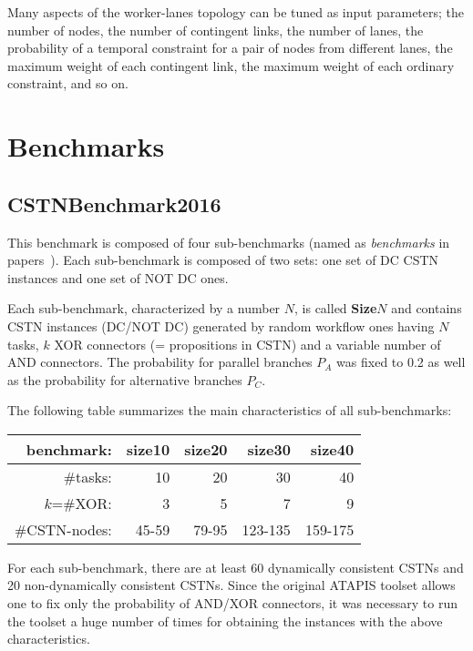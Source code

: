 \documentclass[a4paper,11pt]{article}
\begin{document}
Many aspects of the worker-lanes topology can be tuned as input parameters;  
the number of nodes, the number of contingent links, the number of lanes, the probability of a temporal constraint for a pair of nodes from different lanes, the maximum weight of each contingent link, the maximum weight of each ordinary constraint, and so on.



\section{Benchmarks}
\subsection{CSTNBenchmark2016}

This benchmark is composed of four sub-benchmarks (named as \textit{benchmarks} in papers~\cite{time2015,HunsbergerP16Icaps,CairoEtalTime2017,HunsbergerPFixed18,HunsbergerPEpsilon18,HunsbergerP20}).
Each sub-benchmark is composed of two sets: one set of DC CSTN instances and one set of NOT DC ones.

Each sub-benchmark, characterized by a number $N$, is called  \textbf{Size$N$} and contains CSTN instances (DC\slash NOT DC) generated by random workflow ones having $N$ tasks, $k$ XOR connectors (= propositions in CSTN) and a variable number of AND connectors. 
The probability for parallel branches $P_A$ was fixed to 0.2 as well as the probability for alternative branches $P_C$. 

The following table summarizes the main characteristics of all sub-benchmarks:
\begin{center}
\begin{tabular}{rrrrr}
	\hline
  \textbf{benchmark}: & \textbf{size10}	& \textbf{size20}	& \textbf{size30}	& \textbf{size40}\\
  \hline
  \#tasks: & 10 & 20 & 30 & 40 \\ 
  $k$=\#XOR: & 3 & 5 & 7 & 9\\%
  \#CSTN-nodes: & 45-59 &79-95& 123-135&159-175\\
  \hline
\end{tabular}
\end{center}
For each sub-benchmark, there are at least 60 dynamically consistent CSTNs and 20 non-dynamically consistent CSTNs.
Since the original ATAPIS toolset allows one to fix only the probability of AND\slash XOR connectors, it was necessary to run the toolset a huge number of times for obtaining the instances with the above characteristics.
\end{document}
